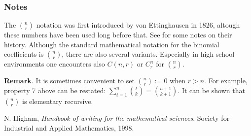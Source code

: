 \documentclass[12pt]{article}
\begin{document}
\subsubsection*{Notes} 
The ${n\choose r}$ notation was first introduced by 
von Ettinghausen \cite{Higham} in 1826, altough
these numbers have been used long before that. See 
 for some notes on their history. 
Although the standard mathematical notation for the binomial coefficients is $n\choose r$, there
are also several variants. Especially in high school environments one encounters also 
${C}(n,r)$ or ${C}^n_r$ for ${n\choose r}$.

\textbf{Remark}.  It is sometimes convenient to set ${n \choose r}:=0$ when $r>n$.  For example, property 7 above can be restated: $\sum_{t=1}^n {t\choose k }={n+1\choose k+1}$.  It can be shown that ${n \choose r}$ is elementary recursive.
  
\begin{thebibliography}{9}
 N. Higham, \emph{Handbook of writing for the mathematical sciences},
Society for Industrial and Applied Mathematics, 1998. 
\end{thebibliography}
\end{document}
